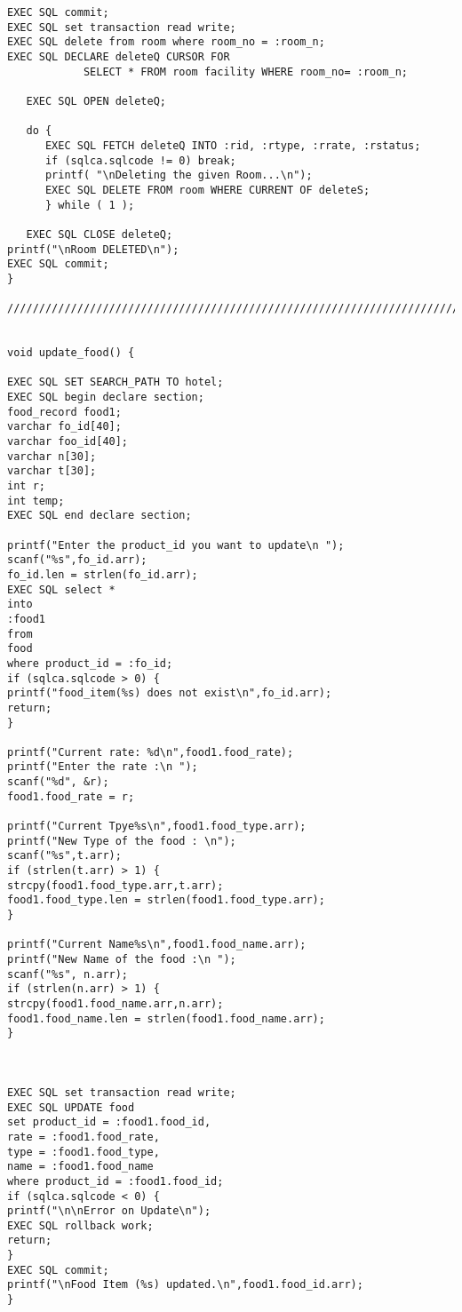 \documentclass[a4,12pt]{report}
\begin{document}
\begin{lstlisting}
EXEC SQL commit;
EXEC SQL set transaction read write;
EXEC SQL delete from room where room_no = :room_n;
EXEC SQL DECLARE deleteQ CURSOR FOR
            SELECT * FROM room facility WHERE room_no= :room_n;
 
   EXEC SQL OPEN deleteQ;
 
   do {
      EXEC SQL FETCH deleteQ INTO :rid, :rtype, :rrate, :rstatus;
      if (sqlca.sqlcode != 0) break;
      printf( "\nDeleting the given Room...\n");
      EXEC SQL DELETE FROM room WHERE CURRENT OF deleteS;
      } while ( 1 );
 
   EXEC SQL CLOSE deleteQ;
printf("\nRoom DELETED\n");
EXEC SQL commit;
}

///////////////////////////////////////////////////////////////////////////////////////////////////////////////////////////////////////////


void update_food() {

EXEC SQL SET SEARCH_PATH TO hotel;
EXEC SQL begin declare section;
food_record food1;
varchar fo_id[40];
varchar foo_id[40];
varchar n[30];
varchar t[30];
int r;
int temp;
EXEC SQL end declare section;

printf("Enter the product_id you want to update\n ");
scanf("%s",fo_id.arr);
fo_id.len = strlen(fo_id.arr);
EXEC SQL select *
into
:food1
from
food
where product_id = :fo_id;
if (sqlca.sqlcode > 0) {
printf("food_item(%s) does not exist\n",fo_id.arr);
return;
}

printf("Current rate: %d\n",food1.food_rate);
printf("Enter the rate :\n ");
scanf("%d", &r);
food1.food_rate = r;

printf("Current Tpye%s\n",food1.food_type.arr);
printf("New Type of the food : \n");
scanf("%s",t.arr);
if (strlen(t.arr) > 1) {
strcpy(food1.food_type.arr,t.arr);
food1.food_type.len = strlen(food1.food_type.arr);
}

printf("Current Name%s\n",food1.food_name.arr);
printf("New Name of the food :\n ");
scanf("%s", n.arr);
if (strlen(n.arr) > 1) {
strcpy(food1.food_name.arr,n.arr);
food1.food_name.len = strlen(food1.food_name.arr);
}



EXEC SQL set transaction read write; 
EXEC SQL UPDATE food
set product_id = :food1.food_id,
rate = :food1.food_rate,
type = :food1.food_type,
name = :food1.food_name
where product_id = :food1.food_id;
if (sqlca.sqlcode < 0) {
printf("\n\nError on Update\n");
EXEC SQL rollback work;
return;
}
EXEC SQL commit;
printf("\nFood Item (%s) updated.\n",food1.food_id.arr);
}


\end{lstlisting}
\end{document}
